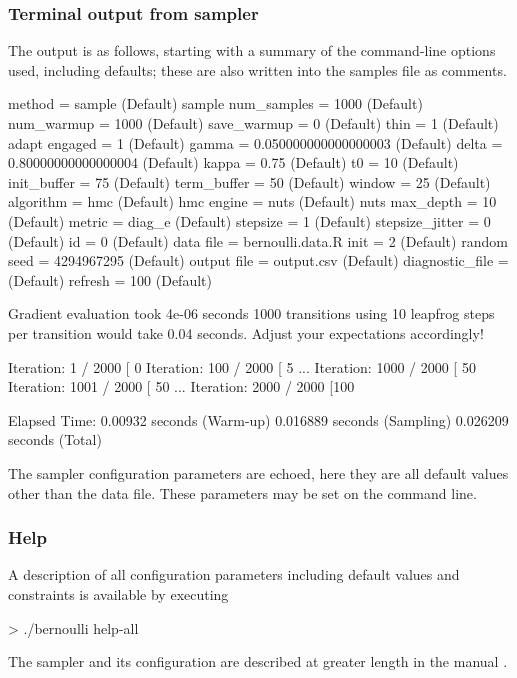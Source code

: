 \documentclass[article]{jss}
\begin{document}
\subsubsection{Terminal output from sampler}

The output is as follows, starting with a summary of the command-line
options used, including defaults;  these are also written into the 
samples file as comments.
%
\begin{Code}
 method = sample (Default)
   sample
     num_samples = 1000 (Default)
     num_warmup = 1000 (Default)
     save_warmup = 0 (Default)
     thin = 1 (Default)
     adapt
       engaged = 1 (Default)
       gamma = 0.050000000000000003 (Default)
       delta = 0.80000000000000004 (Default)
       kappa = 0.75 (Default)
       t0 = 10 (Default)
       init_buffer = 75 (Default)
       term_buffer = 50 (Default)
       window = 25 (Default)
     algorithm = hmc (Default)
       hmc
         engine = nuts (Default)
           nuts
             max_depth = 10 (Default)
         metric = diag_e (Default)
         stepsize = 1 (Default)
         stepsize_jitter = 0 (Default)
 id = 0 (Default)
 data
   file = bernoulli.data.R
 init = 2 (Default)
 random
   seed = 4294967295 (Default)
 output
   file = output.csv (Default)
   diagnostic_file =  (Default)
   refresh = 100 (Default)

Gradient evaluation took 4e-06 seconds
1000 transitions using 10 leapfrog steps per transition would take 0.04 seconds.
Adjust your expectations accordingly!

Iteration:    1 / 2000 [  0%
Iteration:  100 / 2000 [  5%
...
Iteration: 1000 / 2000 [ 50%
Iteration: 1001 / 2000 [ 50%
...
Iteration: 2000 / 2000 [100%

  Elapsed Time: 0.00932 seconds (Warm-up)
                0.016889 seconds (Sampling)
                0.026209 seconds (Total)
\end{Code}
%
The sampler configuration parameters are echoed, here they are all
default values other than the data file.  These parameters may be set
on the command line.  

\subsubsection{Help}

A description of all configuration parameters including default values
and constraints is available by executing
%
\begin{CodeChunk}
\begin{CodeInput}
> ./bernoulli help-all
\end{CodeInput}
\end{CodeChunk}
%
The sampler and its configuration are described at greater length in
the manual \citep{Stan:2013}.
\end{document}
